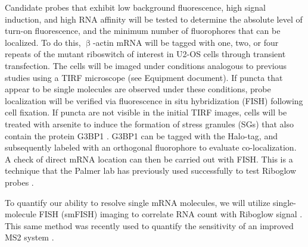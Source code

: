 Candidate probes that exhibit low background fluorescence, high signal induction, and high RNA affinity will be tested to determine the absolute level of turn-on fluorescence, and the minimum number of fluorophores that can be localized. To do this, $\upbeta$-actin mRNA will be tagged with one, two, or four repeats of the mutant riboswitch of interest in U2-OS cells through transient transfection. The cells will be imaged under conditions analogous to previous studies \cite{KatzMappingtranslationhotspots2016} using a TIRF microscope (see Equipment document). If puncta that appear to be single molecules are observed under these conditions, probe localization will be verified via fluorescence in situ hybridization (FISH) following cell fixation. If puncta are not visible in the initial TIRF images, cells will be treated with arsenite to induce the formation of stress granules (SGs) that also contain the protein G3BP1 \cite{ZurlaCharacterizingmRNAInteractions2011,JainATPaseModulatedStressGranules2016,NellesProgrammableRNATracking2016}.
G3BP1 can be tagged with the Halo-tag, and subsequently labeled with an orthogonal fluorophore to evaluate co-localization. A check of direct mRNA location can then be carried out with FISH.
This is a technique that the Palmer lab has previously used successfully to test Riboglow probes \cite{BraselmannDevelopmentriboswitchbasedplatform2017}.

To quantify our ability to resolve single mRNA molecules, we will utilize single-molecule FISH (smFISH) imaging to correlate RNA count with Riboglow signal \cite{MuellerFISHquantautomaticcounting2013}. This same method was recently used to quantify the sensitivity of an improved MS2 system \cite{TutucciimprovedMS2system2018}.

